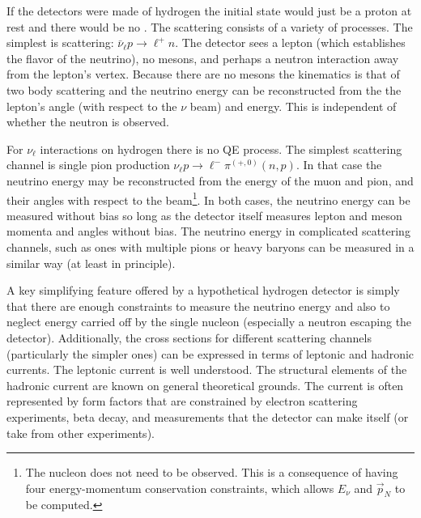 
If the detectors were made of hydrogen the initial state would just be a proton at rest and there would be no . The scattering consists of a variety of processes. The simplest is  scattering: $\bar{\nu}_\ell p \to \ell^+ n$. The detector sees a lepton (which establishes the flavor of the neutrino), no mesons, and perhaps a neutron interaction away from the lepton's vertex. Because there are no mesons the kinematics is that of two body scattering and the neutrino energy can be reconstructed from the the lepton's angle (with respect to the $\nu$ beam) and energy. This is independent of whether the neutron is observed.

For $\nu_\ell$ interactions on hydrogen there is no QE process. The simplest scattering channel is single pion production $\nu_\ell p \to \ell^- \pi^{(+,0)} (n,p)$. In that case the neutrino energy may be reconstructed from the energy of the muon and pion, and their angles with respect to the beam\footnote{The nucleon does not need to be observed. This is a consequence of having four energy-momentum conservation constraints, which allows $E_\nu$ and $\vec{p}_N$ to be computed.}. In both cases, the neutrino energy can be measured without bias so long as the detector itself measures lepton and meson momenta and angles without bias.  The neutrino energy in complicated scattering channels, such as ones with multiple pions or heavy baryons can be measured in a similar way (at least in principle).

A key simplifying feature offered by a hypothetical hydrogen detector is simply that there are enough constraints to measure the neutrino energy and also to neglect energy carried off by the single nucleon (especially a neutron escaping the detector). Additionally, the cross sections for different scattering channels (particularly the simpler ones) can be expressed in terms of leptonic and hadronic currents. The leptonic current is well understood. The structural elements of the hadronic current are known on general theoretical grounds. The current is often represented by form factors that are constrained by electron scattering experiments, beta decay, and measurements that the detector can make itself (or take from other experiments). 



